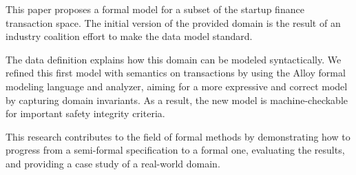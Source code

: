 This paper proposes a formal model for a subset of the startup finance transaction space. The initial version of the provided domain is the result of an industry coalition effort to make the data model standard.

The data definition explains how this domain can be modeled syntactically. We refined this first model with semantics on transactions by using the Alloy formal modeling language and analyzer, aiming for a more expressive and correct model by capturing domain invariants. As a result, the new model is machine-checkable for important safety integrity criteria.

This research contributes to the field of formal methods by demonstrating how to progress from a semi-formal specification to a formal one, evaluating the results, and providing a case study of a real-world domain.